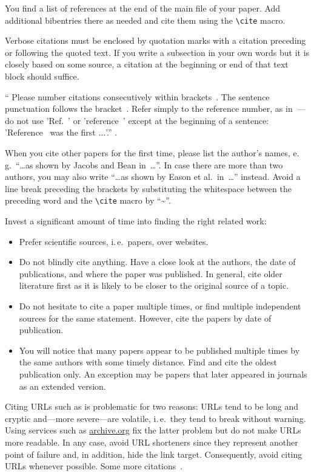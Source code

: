 You find a list of references at the end of the main file of your paper.
Add additional bibentries there as needed and cite them using the
\texttt{\textbackslash{}cite{}} macro.

Verbose citations must be enclosed by quotation marks with a citation
preceding or following the quoted text.
If you write a subsection in your own words but it is closely based on some
source, a citation at the beginning or end of that text block should suffice.

``%
Please number citations consecutively within brackets~\cite{b1}.
The sentence punctuation follows the bracket~\cite{b2}.
Refer simply to the reference number, as in~\cite{b3}---do not use
'Ref.~\cite{b3}' or 'reference~\cite{b3}' except at the beginning of a
sentence: 'Reference~\cite{b3} was the first $\ldots$'.'' \cite{b8}.

When you cite other papers for the first time, please list the author's names,
e.\,g.\ ``\ldots as shown by Jacobs and Bean in~\cite{b3}\ldots''.
In case there are more than two authors, you may also write ``\ldots as shown
by Eason et al.\ in~\cite{b1}\ldots'' instead.
Avoid a line break preceding the brackets by substituting the whitespace
between the preceding word and the \texttt{\textbackslash{}cite} macro by
``\textasciitilde{}''.

Invest a significant amount of time into finding the right related work:
\begin{itemize}
	\item Prefer scientific sources, i.\,e.\ papers, over websites.
	\item Do not blindly cite anything.
	Have a close look at the authors, the date of publications, and where the
	paper was published.
	In general, cite older literature first as it is likely to be closer to the
	original source of a topic.
	\item Do not hesitate to cite a paper multiple times, or find multiple
	independent sources for the same statement.
	However, cite the papers by date of publication.
	\item You will notice that many papers appear to be published multiple
	times by the same authors with some timely distance.
	Find and cite the oldest publication only.
	An exception may be papers that later appeared in journals as an extended
	version.
\end{itemize}

Citing URLs such as \cite{b9} is problematic for two reasons:
URLs tend to be long and cryptic and---more severe---are volatile, i.\,e.\,
they tend to break without warning.
Using services such as \url{archive.org} fix the latter problem but do not make
URLs more readable.
In any case, avoid URL shorteners since they represent another point of failure
and, in addition, hide the link target.
Consequently, avoid citing URLs whenever possible.
Some more citations~\cite{b4,b6,b7,b8,b9}.


